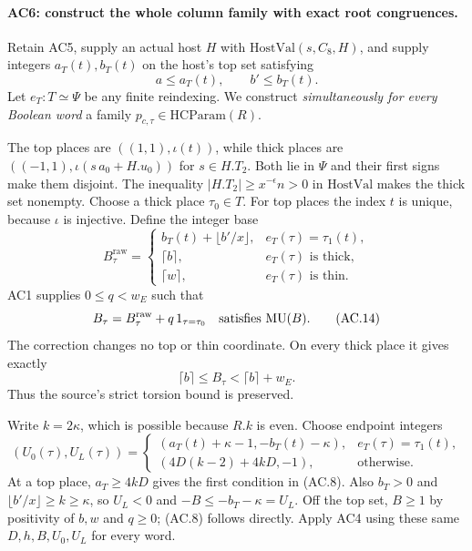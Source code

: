\documentclass[11pt,a4paper]{article}
\numberwithin{equation}{section}
\theoremstyle{remark}\newtheorem{remark}[theorem]{Remark}
\begin{document}
\paragraph{AC6: construct the whole column family with exact root congruences.}
Retain AC5, supply an actual host $H$ with
$\mathrm{HostVal}(s,C_8,H)$, and supply integers $a_T(t),b_T(t)$
on the host's top set satisfying
\[
                         a\leq a_T(t),\qquad b'\leq b_T(t).
                                                               \tag{AC.12}
\]
Let $e_T:T\simeq\Psi$ be any finite reindexing. We construct
\emph{simultaneously for every Boolean word} a family
$p_{c,\tau}\in\mathrm{HCParam}(R)$.

The top places are $((1,1),\iota(t))$, while thick places are
$((-1,1),\iota(s\,a_0+H.u_0))$ for $s\in H.T_2$.
Both lie in $\Psi$ and their first signs make them disjoint.
The inequality $|H.T_2|\geq x^{-\epsilon}n>0$ in
$\mathrm{HostVal}$ makes the thick set nonempty.
Choose a thick place $\tau_0\in T$.
For top places the index $t$ is unique, because $\iota$ is injective.
Define the integer base
\[
 B^{\mathrm{raw}}_\tau=
 \begin{cases}
 b_T(t)+\lfloor b'/x\rfloor,&e_T(\tau)=\tau_1(t),\\
 \lceil b\rceil,&e_T(\tau)\text{ is thick},\\
 \lceil w\rceil,&e_T(\tau)\text{ is thin}.
 \end{cases}                                                 \tag{AC.13}
\]
AC1 supplies $0\leq q<w_E$ such that
\[
             B_\tau=B^{\mathrm{raw}}_\tau+q\,1_{\tau=\tau_0}
                          \quad\hbox{satisfies }\mathrm{MU}(B).
                                                               \tag{AC.14}
\]
The correction changes no top or thin coordinate. On every thick
place it gives exactly
\[
                 \lceil b\rceil\leq B_\tau
                            <\lceil b\rceil+w_E.             \tag{AC.15}
\]
Thus the source's strict torsion bound is preserved.

Write $k=2\kappa$, which is possible because $R.k$ is even.
Choose endpoint integers
\[
 (U_0(\tau),U_L(\tau))=
 \begin{cases}
 (a_T(t)+\kappa-1,-b_T(t)-\kappa),
                                  &e_T(\tau)=\tau_1(t),\\
 (4D(k-2)+4kD,-1),                &\text{otherwise}.
 \end{cases}                                                 \tag{AC.16}
\]
At a top place, $a_T\geq4kD$ gives the first condition in (AC.8).
Also $b_T>0$ and
$\lfloor b'/x\rfloor\geq k\geq\kappa$, so $U_L<0$ and
$-B\leq-b_T-\kappa=U_L$.
Off the top set, $B\geq1$ by positivity of $b,w$ and $q\geq0$;
(AC.8) follows directly. Apply AC4 using these same $D,h,B,U_0,U_L$
for every word.
\end{document}
